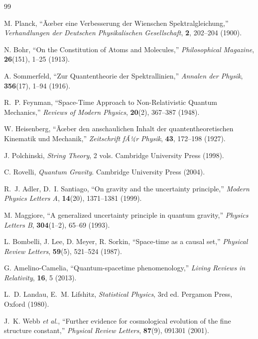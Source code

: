 ﻿\documentclass[12pt,a4paper]{article}
\theoremstyle{plain}
\theoremstyle{definition}
\theoremstyle{remark}
\begin{document}
\begin{thebibliography}{99}

M. Planck, ``Ãœber eine Verbesserung der Wienschen Spektralgleichung,''
\textit{Verhandlungen der Deutschen Physikalischen Gesellschaft}, \textbf{2}, 202--204 (1900).

N. Bohr, ``On the Constitution of Atoms and Molecules,''
\textit{Philosophical Magazine}, \textbf{26}(151), 1--25 (1913).

A. Sommerfeld, ``Zur Quantentheorie der Spektrallinien,''
\textit{Annalen der Physik}, \textbf{356}(17), 1--94 (1916).

R.~P. Feynman, ``Space-Time Approach to Non-Relativistic Quantum Mechanics,''
\textit{Reviews of Modern Physics}, \textbf{20}(2), 367--387 (1948).

W. Heisenberg, ``Ãœber den anschaulichen Inhalt der quantentheoretischen Kinematik und
Mechanik,'' \textit{Zeitschrift fÃ¼r Physik}, \textbf{43}, 172--198 (1927).

J. Polchinski, \textit{String Theory}, 2 vols. Cambridge University Press (1998).

C. Rovelli, \textit{Quantum Gravity}. Cambridge University Press (2004).

R.~J. Adler, D.~I. Santiago, ``On gravity and the uncertainty principle,''
\textit{Modern Physics Letters A}, \textbf{14}(20), 1371--1381 (1999).

M. Maggiore, ``A generalized uncertainty principle in quantum gravity,''
\textit{Physics Letters B}, \textbf{304}(1--2), 65--69 (1993).

L. Bombelli, J. Lee, D. Meyer, R. Sorkin, ``Space-time as a causal set,''
\textit{Physical Review Letters}, \textbf{59}(5), 521--524 (1987).

G. Amelino-Camelia, ``Quantum-spacetime phenomenology,''
\textit{Living Reviews in Relativity}, \textbf{16}, 5 (2013).

L.~D. Landau, E.~M. Lifshitz, \textit{Statistical Physics}, 3rd ed.
Pergamon Press, Oxford (1980).

J.~K. Webb \textit{et al.}, ``Further evidence for cosmological evolution of the fine
structure constant,'' \textit{Physical Review Letters}, \textbf{87}(9), 091301 (2001).


\end{thebibliography}
\end{document}

